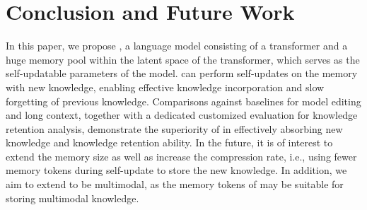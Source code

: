 \section{Conclusion and Future Work}
In this paper, we propose \ours, a language model
consisting of a transformer and a huge memory pool within the latent space of the transformer, which serves as the self-updatable parameters of the model. 
\ours
can perform self-updates on the memory with new knowledge, enabling effective knowledge incorporation and slow forgetting of previous knowledge.
Comparisons against baselines for model editing and long context, together with a dedicated customized evaluation for knowledge retention analysis, demonstrate the superiority of \ours in effectively absorbing new knowledge and knowledge retention ability. 
In the future, it is of interest to extend the memory size as well as increase the compression rate, i.e., using fewer memory tokens during self-update to store the new knowledge. 
In addition, we aim to extend \ours to be multimodal, as the memory tokens of \ours may be suitable for storing multimodal knowledge. 
